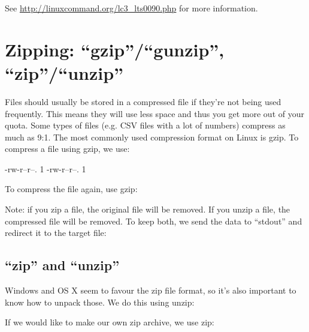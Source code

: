 See \url{http://linuxcommand.org/lc3_lts0090.php} for more information.

\section{Zipping: ``gzip''/``gunzip'', ``zip''/``unzip''}

Files should usually be stored in a compressed file if they're not being used
frequently. This means they will use less space and thus you get more out of
your quota. Some types of files (e.g. CSV files with a lot of numbers) compress
as much as 9:1. The most commonly used compression format on Linux is gzip. To
compress a file using gzip, we use:

\begin{prompt}
    -rw-r--r--. 1 %
    -rw-r--r--. 1 %
\end{prompt}


To compress the file again, use gzip:

\begin{prompt}
\end{prompt}

Note: if you zip a file, the original file will be removed. If you unzip a file,
the compressed file will be removed. To keep both, we send the data to
``stdout'' and redirect it to the target file:

\begin{prompt}
\end{prompt}

\subsection{``zip'' and ``unzip''} 

Windows and OS X seem to favour the zip file format, so it's also important to
know how to unpack those. We do this using unzip:

\begin{prompt}
\end{prompt}

If we would like to make our own zip archive, we use zip:

\begin{prompt}
\end{prompt}

